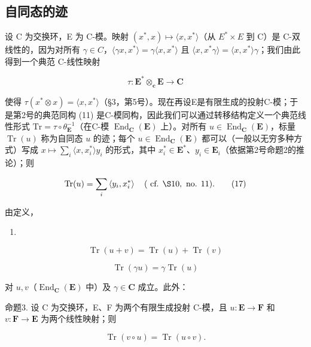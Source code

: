 \subsection{自同态的迹}

设 C 为交换环，E 为 C-模。映射 \((x^{*}, x) \mapsto \langle x, x^{*} \rangle\)（从 \(E^{*} \times E\) 到 C）是 C-双线性的，因为对所有 \(\gamma \in C\)，\(\langle \gamma x, x^{*} \rangle = \gamma \langle x, x^{*} \rangle\) 且 \(\langle x, x^{*} \gamma \rangle = \langle x, x^{*} \rangle \gamma\)；我们由此得到一个典范 C-线性映射

\[
\tau : \mathbf {E} ^ {*} \otimes_ {\mathbf {c}} \mathbf {E} \rightarrow \mathbf {C}\tag{16}
\]

使得 \(\tau(x^{*} \otimes x) = \langle x, x^{*} \rangle\)（§3，第5号）。现在再设E是有限生成的投射C-模；于是第2号的典范同构 (11) 是C-模同构，因此我们可以通过转移结构定义一个典范线性形式 \(\mathrm{Tr} = \tau \circ \theta_{\mathbf{E}}^{-1}\)（在C-模 \(\operatorname{End}_{\mathbf{C}}(\mathbf{E})\) 上）。对所有 \(u \in \operatorname{End}_{\mathbf{C}}(\mathbf{E})\)，标量 \(\operatorname{Tr}(u)\) 称为自同态 \(u\) 的迹；每个 \(u \in \operatorname{End}_{\mathbf{C}}(\mathbf{E})\) 都可以（一般以无穷多种方式）写成 \(x \mapsto \sum_{i} \langle x, x_{i}^{*} \rangle y_{i}\) 的形式，其中 \(x_{i}^{*} \in \mathbf{E}^{*}\)、\(y_{i} \in \mathbf{E}_{i}\)（依据第2号命题2的推论）；则

\[
\operatorname{Tr} (u) = \sum_ {i} \left\langle y _ {i}, x _ {i} ^ {*} \right\rangle \quad (\text { cf. } \S 1 0, \text { no. } 1 1).\tag{17}
\]

由定义，

\begin{enumerate}
\def\labelenumi{(\arabic{enumi})}
\setcounter{enumi}{17}
\tightlist
\item
\end{enumerate}

\[
\operatorname{Tr} (u + v) = \operatorname{Tr} (u) + \operatorname{Tr} (v)\tag{19}
\]

\[
\operatorname{Tr} (\gamma u) = \gamma \operatorname{Tr} (u)
\]

对 \(u, v\)（\(\operatorname{End}_{\mathbf{C}}(\mathbf{E})\) 中）及 \(\gamma \in \mathbf{C}\) 成立。此外：

命题3. 设 C 为交换环，E、F 为两个有限生成投射 C-模，且 \(u: \mathbf{E} \to \mathbf{F}\) 和 \(v: \mathbf{F} \to \mathbf{E}\) 为两个线性映射；则

\[
\operatorname{Tr} (v \circ u) = \operatorname{Tr} (u \circ v).\tag{20}
\]

